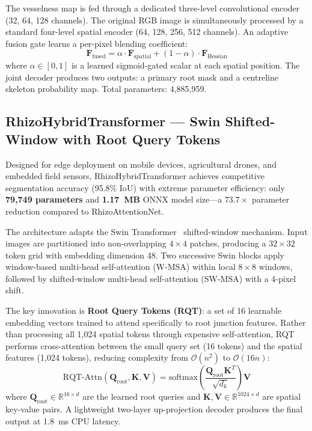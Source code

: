 \documentclass[final,3p,times,nonatbib]{elsarticle}
\begin{document}
The vesselness map is fed through a dedicated three-level convolutional encoder (32, 64, 128 channels). The original RGB image is simultaneously processed by a standard four-level spatial encoder (64, 128, 256, 512 channels). An adaptive fusion gate learns a per-pixel blending coefficient:
\begin{equation}
    \mathbf{F}_{\text{fused}} = \alpha \cdot \mathbf{F}_{\text{spatial}} + (1 - \alpha) \cdot \mathbf{F}_{\text{Hessian}}
\end{equation}
where $\alpha \in [0, 1]$ is a learned sigmoid-gated scalar at each spatial position. The joint decoder produces two outputs: a primary root mask and a centreline skeleton probability map. Total parameters: 4,885,959.


\subsection{RhizoHybridTransformer --- Swin Shifted-Window with Root Query Tokens}
Designed for edge deployment on mobile devices, agricultural drones, and embedded field sensors, RhizoHybridTransformer achieves competitive segmentation accuracy (95.8\% IoU) with extreme parameter efficiency: only \textbf{79,749 parameters} and \textbf{1.17~MB} ONNX model size---a $73.7\times$ parameter reduction compared to RhizoAttentionNet.

The architecture adapts the Swin Transformer~\cite{liu2021swin} shifted-window mechanism. Input images are partitioned into non-overlapping $4 \times 4$ patches, producing a $32 \times 32$ token grid with embedding dimension 48. Two successive Swin blocks apply window-based multi-head self-attention (W-MSA) within local $8 \times 8$ windows, followed by shifted-window multi-head self-attention (SW-MSA) with a 4-pixel shift.

The key innovation is \textbf{Root Query Tokens (RQT)}: a set of 16 learnable embedding vectors trained to attend specifically to root junction features. Rather than processing all 1,024 spatial tokens through expensive self-attention, RQT performs cross-attention between the small query set (16 tokens) and the spatial features (1,024 tokens), reducing complexity from $\mathcal{O}(n^2)$ to $\mathcal{O}(16n)$:
\begin{equation}
    \text{RQT-Attn}(\mathbf{Q}_{\text{root}}, \mathbf{K}, \mathbf{V}) = \text{softmax}\left(\frac{\mathbf{Q}_{\text{root}} \mathbf{K}^T}{\sqrt{d_k}}\right) \mathbf{V}
\end{equation}
where $\mathbf{Q}_{\text{root}} \in \mathbb{R}^{16 \times d}$ are the learned root queries and $\mathbf{K}, \mathbf{V} \in \mathbb{R}^{1024 \times d}$ are spatial key-value pairs. A lightweight two-layer up-projection decoder produces the final output at 1.8~ms CPU latency.
\end{document}
